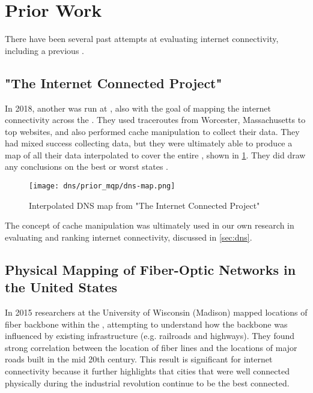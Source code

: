 \section{Prior Work}\label{sec:background_prior_work}

There have been several past attempts at evaluating \us internet connectivity, including a previous \wpi \mqp.

 
\subsection{"The Internet Connected Project"}
In 2018, another \mqp was run at \wpi, also with the goal of mapping the internet connectivity across the \us. They used traceroutes from Worcester, Massachusetts to top websites, and also performed \dns cache manipulation to collect their data. They had mixed success collecting data, but they were ultimately able to produce a map of all their \dns data interpolated to cover the entire \us, shown in \cref{fig:interpolated_dns_map}. They did draw any conclusions on the best or worst states \cite{Fakult2019}.

\begin{figure}[h]
    \centering
    \texttt{[image: dns/prior\_mqp/dns-map.png]}
    \caption{Interpolated DNS map from "The Internet Connected Project"\cite{Fakult2019}}
    \label{fig:interpolated_dns_map}
\end{figure}

The concept of \dns cache manipulation was ultimately used in our own research in evaluating and ranking internet connectivity, discussed in \cref{sec:dns}.

\subsection{Physical Mapping of Fiber-Optic Networks in the United States}
In 2015 researchers at the University of Wisconsin (Madison) mapped locations of fiber backbone within the \us, attempting to understand how the backbone was influenced by existing infrastructure (e.g. railroads and highways). They found strong correlation between the location of fiber lines and the locations of major roads built in the mid 20th century. This result is significant for internet connectivity because it further highlights that cities that were well connected physically during the industrial revolution continue to be the best connected.
 